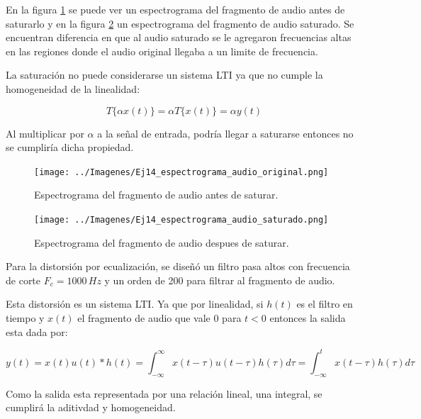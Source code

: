 \documentclass[10pt,spanish,a4paper,openany,notitlepage]{article}
\begin{document}
En la figura \ref{fig:espectrograma_sin_saturar} se puede ver un espectrograma
del fragmento de audio antes de saturarlo y en la figura \ref{fig:espectrograma_saturado}
un espectrograma del fragmento de audio saturado.
Se encuentran diferencia en que al audio saturado se le agregaron frecuencias
altas en las regiones donde el audio original llegaba a un limite de frecuencia.

La saturación no puede considerarse un sistema LTI ya que no cumple la
homogeneidad de la linealidad:

\[ \displaystyle T\{\alpha x(t)\}= \alpha T\{x(t)\} = \alpha y(t)\]

Al multiplicar por $\alpha$ a la señal de entrada, podría llegar a saturarse
entonces no se cumpliría dicha propiedad. 

\begin{figure}[H] %
\begin{center}
\texttt{[image: ../Imagenes/Ej14\_espectrograma\_audio\_original.png]}
\caption{Espectrograma del fragmento de audio antes de saturar.}
 \label{fig:espectrograma_sin_saturar}
\end{center}
\end{figure}


\begin{figure}[H] %
\begin{center}
\texttt{[image: ../Imagenes/Ej14\_espectrograma\_audio\_saturado.png]}
\caption{Espectrograma del fragmento de audio despues de saturar.}
 \label{fig:espectrograma_saturado}
\end{center}
\end{figure}

Para la distorsión por ecualización, se diseñó un filtro pasa altos
con frecuencia de corte $F_c = 1000\, \unit{Hz}$ y un orden de 200 para
filtrar al fragmento de audio.

Esta distorsión es un sistema LTI. Ya que por linealidad, si $h(t)$ es
el filtro en tiempo y $x(t)$ el fragmento de audio que vale 0 para $t<0$
entonces la salida esta dada por:

\begin{equation}
\label{eq:y}
y(t) = x(t) u(t) * h(t) = \int_{-\infty}^\infty x(t-\tau) u(t-\tau) h(\tau) d\tau = \int_{-\infty}^t x(t-\tau) h(\tau) d\tau
\end{equation}

Como la salida esta representada por una relación lineal, una integral, 
se cumplirá la aditivdad y homogeneidad.
\end{document}
